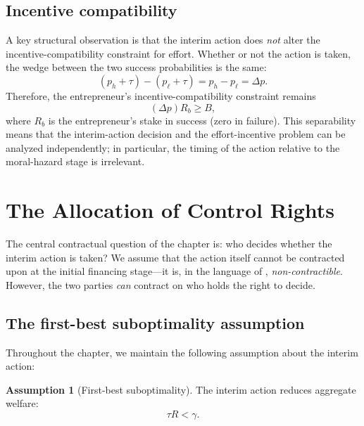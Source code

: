\documentclass[11pt,a4paper,oneside]{book}
\def\geq{\geqslant}
\theoremstyle{plain}
\theoremstyle{definition}
\newtheorem{assumption}[theorem]{Assumption}
\theoremstyle{remark}
\numberwithin{equation}{chapter}
\begin{document}
\subsection{Incentive compatibility}

A key structural observation is that the interim action does \emph{not} alter the incentive-compatibility constraint for effort.
Whether or not the action is taken, the wedge between the two success probabilities is the same:
\begin{equation*}
  (p_h + \tau) - (p_\ell + \tau) = p_h - p_\ell = \Delta p.
\end{equation*}
Therefore, the entrepreneur's incentive-compatibility constraint remains
\begin{equation}\label{eq:control-IC}
  (\Delta p) R_b \geq B,
\end{equation}
where $R_b$ is the entrepreneur's stake in success (zero in failure).
This separability means that the interim-action decision and the effort-incentive problem can be analyzed independently; in particular, the timing of the action relative to the moral-hazard stage is irrelevant.

\section{The Allocation of Control Rights}
\label{sec:control-allocation}

The central contractual question of the chapter is: who decides whether the interim action is taken?
We assume that the action itself cannot be contracted upon at the initial financing stage---it is, in the language of \citet{HartMoore1990}, \emph{non-contractible}.
However, the two parties \emph{can} contract on who holds the right to decide.

\subsection{The first-best suboptimality assumption}

Throughout the chapter, we maintain the following assumption about the interim action:

\begin{assumption}[First-best suboptimality]\label{ass:control-FBsub}
The interim action reduces aggregate welfare:
\begin{equation}\label{eq:control-FBsub}
  \tau R < \gamma.
\end{equation}
\end{assumption}
\end{document}
